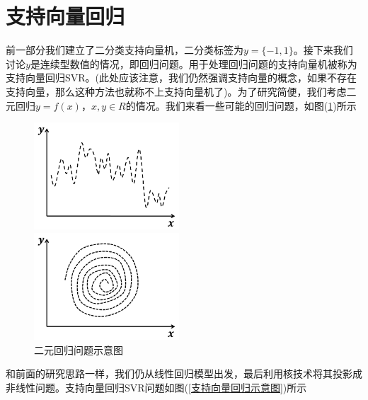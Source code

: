 \section{支持向量回归}
    \par
    前一部分我们建立了二分类支持向量机，二分类标签为$y=\{-1,1\}$。接下来我们讨论$y$是连续型数值的情况，即回归问题。用于处理回归问题的支持向量机被称为支持向量回归SVR。(此处应该注意，我们仍然强调支持向量的概念，如果不存在支持向量，那么这种方法也就称不上支持向量机了)。为了研究简便，我们考虑二元回归$y=f(x)$，$x,y\in R$的情况。我们来看一些可能的回归问题，如图(\ref{二元回归问题示意图})所示
			\begin{figure}[H]
			  \centering
			  \begin{varwidth}[t]{\textwidth}
			    \vspace{0pt}
			    \includegraphics[height=4cm]{images/Binary_regression1.jpg}
			  \end{varwidth}
			  \qquad
			  \begin{varwidth}[t]{\textwidth}
			    \vspace{0pt}
			    \includegraphics[height=4cm]{images/Binary_regression2.jpg}
 			 \end{varwidth}
            \caption{二元回归问题示意图}
            \label{二元回归问题示意图}
            \end{figure}
    \par
    和前面的研究思路一样，我们仍从线性回归模型出发，最后利用核技术将其投影成非线性问题。支持向量回归SVR问题如图(\ref{支持向量回归示意图})所示
